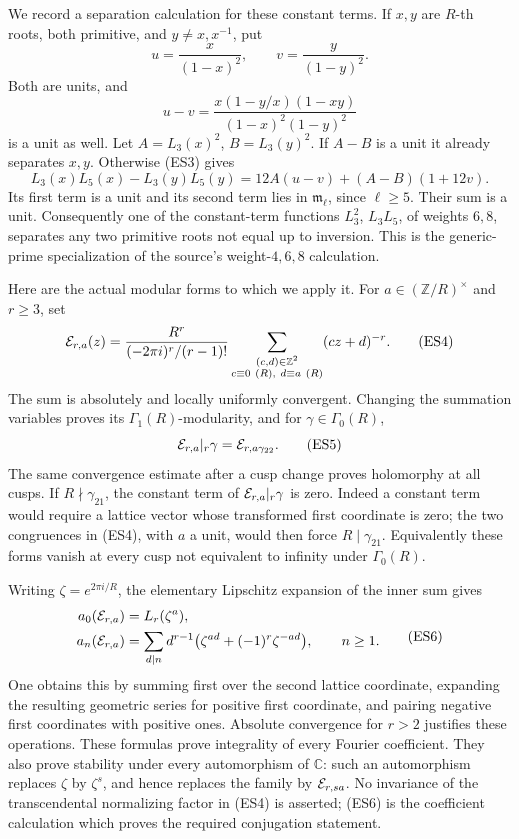 We record a separation calculation for these constant terms.
If \(x,y\) are \(R\)-th roots, both primitive, and
\(y\ne x,x^{-1}\), put
\[
                    u=\frac{x}{(1-x)^2},\qquad
                    v=\frac{y}{(1-y)^2}.
\]
Both are units, and
\[
 u-v=\frac{x(1-y/x)(1-xy)}{(1-x)^2(1-y)^2}
\]
is a unit as well.
Let \(A=L_3(x)^2\), \(B=L_3(y)^2\).
If \(A-B\) is a unit it already separates \(x,y\).
Otherwise (ES3) gives
\[
 L_3(x)L_5(x)-L_3(y)L_5(y)
       =12A(u-v)+(A-B)(1+12v).
\]
Its first term is a unit and its second term lies in
\(\mathfrak m_\ell\), since \(\ell\ge5\).
Their sum is a unit.
Consequently one of the constant-term functions
\(L_3^2\), \(L_3L_5\), of weights \(6,8\), separates any
two primitive roots not equal up to inversion.
This is the generic-prime specialization of the source's
weight-\(4,6,8\) calculation.

Here are the actual modular forms to which we apply it.
For \(a\in(\mathbb Z/R)^\times\) and \(r\ge3\), set
\[
 {\cal E}_{r,a}(z)=
 \frac{R^r}{(-2\pi i)^r/(r-1)!}
       \sum_{\substack{(c,d)\in\mathbb Z^2\\
                 c\equiv0\ (R),\ d\equiv a\ (R)}}
                                    (cz+d)^{-r}.
 \tag{ES4}
\]
The sum is absolutely and locally uniformly convergent.
Changing the summation variables proves its
\(\Gamma_1(R)\)-modularity, and for
\(\gamma\in\Gamma_0(R)\),
\[
             {\cal E}_{r,a}|_r\gamma
                           ={\cal E}_{r,a\gamma_{22}}.
 \tag{ES5}
\]
The same convergence estimate after a cusp change proves
holomorphy at all cusps.
If \(R\nmid\gamma_{21}\), the constant term of
\({\cal E}_{r,a}|_r\gamma\) is zero.
Indeed a constant term would require a lattice vector whose
transformed first coordinate is zero; the two congruences in
(ES4), with \(a\) a unit, would then force
\(R\mid\gamma_{21}\).
Equivalently these forms vanish at every cusp not equivalent
to infinity under \(\Gamma_0(R)\).

Writing \(\zeta=e^{2\pi i/R}\), the elementary Lipschitz
expansion of the inner sum gives
\[
 \begin{split}
 a_0({\cal E}_{r,a})&=L_r(\zeta^a),\\
 a_n({\cal E}_{r,a})&=
   \sum_{d\mid n}d^{r-1}
       \bigl(\zeta^{ad}+(-1)^r\zeta^{-ad}\bigr),\qquad n\ge1 .
 \end{split}
 \tag{ES6}
\]
One obtains this by summing first over the second lattice
coordinate, expanding the resulting geometric series for
positive first coordinate, and pairing negative first
coordinates with positive ones.
Absolute convergence for \(r>2\) justifies these operations.
These formulas prove integrality of every Fourier coefficient.
They also prove stability under every automorphism of
\(\mathbb C\): such an automorphism replaces \(\zeta\) by
\(\zeta^s\), and hence replaces the family by
\({\cal E}_{r,sa}\).
No invariance of the transcendental normalizing factor in
(ES4) is asserted; (ES6) is the coefficient calculation
which proves the required conjugation statement.

